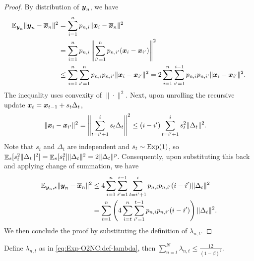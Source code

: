 \begin{proof}
By distribution of ${\boldsymbol{y}}_n$, we have
\begin{align*}
    \mathbb{E}_{{\boldsymbol{y}}_n} \|{\boldsymbol{y}}_n - \overline{{\boldsymbol{x}}}_n\|^2 
    &= \sum_{i=1}^n p_{n,i} \|{\boldsymbol{x}}_i - \overline {{\boldsymbol{x}}}_n\|^2 \\
    &= \sum_{i=1}^n p_{n,i} \left\| \sum_{i'=1}^n p_{n,i'}({\boldsymbol{x}}_i-{\boldsymbol{x}}_{i'}) \right\|^2 \\
    &\le \sum_{i=1}^n\sum_{i'=1}^n p_{n,i}p_{n,i'} \|{\boldsymbol{x}}_i-{\boldsymbol{x}}_{i'}\|^2 
    = 2\sum_{i=1}^n\sum_{i'=1}^{i-1} p_{n,i}p_{n,i'}\|{\boldsymbol{x}}_i-{\boldsymbol{x}}_{i'}\|^2.
\end{align*}
The inequality uses convexity of $\|\cdot\|^2$. Next, upon unrolling the recursive update ${\boldsymbol{x}}_t = {\boldsymbol{x}}_{t-1} + s_t\Delta_t$,
\begin{align*}
    \|{\boldsymbol{x}}_i-{\boldsymbol{x}}_{i'}\|^2
    &= \left\| \sum_{t=i'+1}^i s_t\Delta_t\right\|^2 
    \le (i-i') \sum_{t=i'+1}^i s_t^2\|\Delta_t\|^2.
\end{align*}
Note that $s_t$ and $\Delta_t$ are independent and $s_t\sim \mathrm{Exp}(1)$, so $\mathop{\mathbb{E}}_s[s_t^2\|\Delta_t\|^2] = \mathop{\mathbb{E}}_s[s_t^2] \|\Delta_t\|^2 = 2\|\Delta_t\|^p$. Consequently, upon substituting this back and applying change of summation, we have
\begin{align*}
    \mathbb{E}_{{\boldsymbol{y}}_n,s} \|{\boldsymbol{y}}_n-\overline{{\boldsymbol{x}}}_n\|^2 
    &\le 4\sum_{i=1}^n\sum_{i'=1}^{i-1}\sum_{t=i'+1}^i p_{n,i}p_{n,i'}(i-i') \|\Delta_t\|^2 \\
    &= \sum_{t=1}^n \left(4\sum_{i=t}^n\sum_{i'=1}^{t-1}p_{n,i}p_{n,i'}(i-i')\right) \|\Delta_t\|^2.
\end{align*}
We then conclude the proof by substituting the definition of $\lambda_{n,t}$.
\end{proof}


\begin{proposition}
\label{prop:Exp-O2NC:tech-lam-t:N}
Define $\lambda_{n,t}$ as in \eqref{eq:Exp-O2NC:def-lambda}, then $\sum_{n=t}^N \lambda_{n,t} \le \frac{12}{(1-\beta)^2}$.
\end{proposition}

